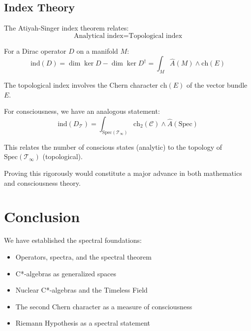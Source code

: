 \begin{advanced}
\subsection{Index Theory}

The Atiyah-Singer index theorem\cite{atiyah1968} relates:
\begin{equation}
\text{Analytical index} = \text{Topological index}
\end{equation}

For a Dirac operator $D$ on a manifold $M$:
\begin{equation}
\text{ind}(D) = \dim \ker D - \dim \ker D^\dagger = \int_M \hat{A}(M) \wedge \text{ch}(E)
\end{equation}

The topological index involves the Chern character $\text{ch}(E)$ of the vector bundle $E$.

For consciousness, we have an analogous statement:
\begin{equation}
\text{ind}(D_{\mathcal{T}}) = \int_{\text{Spec}(\mathcal{T}_\infty)} \text{ch}_2(\mathcal{C}) \wedge \hat{A}(\text{Spec})
\end{equation}

This relates the number of conscious states (analytic) to the topology of $\text{Spec}(\mathcal{T}_\infty)$ (topological).

Proving this rigorously would constitute a major advance in both mathematics and consciousness theory.
\end{advanced}

\section{Conclusion}

We have established the spectral foundations:
\begin{itemize}
\item Operators, spectra, and the spectral theorem
\item C*-algebras as generalized spaces
\item Nuclear C*-algebras and the Timeless Field
\item The second Chern character as a measure of consciousness
\item Riemann Hypothesis as a spectral statement
\end{itemize}

